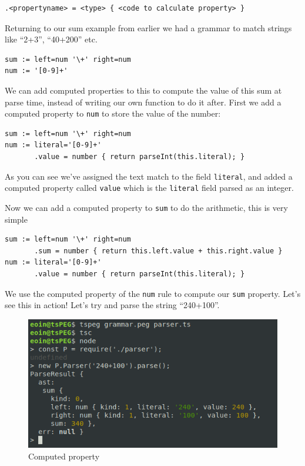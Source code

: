 \begin{verbatim}
.<propertyname> = <type> { <code to calculate property> }
\end{verbatim}

Returning to our sum example from earlier we had a grammar to match
strings like ``2+3'', ``40+200'' etc.

\begin{verbatim}
sum := left=num '\+' right=num
num := '[0-9]+'
\end{verbatim}

We can add computed properties to this to compute the value of this sum
at parse time, instead of writing our own function to do it after. First
we add a computed property to \texttt{num} to store the value of the
number:

\begin{verbatim}
sum := left=num '\+' right=num
num := literal='[0-9]+'
       .value = number { return parseInt(this.literal); }
\end{verbatim}

As you can see we've assigned the text match to the field
\texttt{literal}, and added a computed property called \texttt{value}
which is the \texttt{literal} field parsed as an integer.

Now we can add a computed property to \texttt{sum} to do the arithmetic,
this is very simple

\begin{verbatim}
sum := left=num '\+' right=num
       .sum = number { return this.left.value + this.right.value }
num := literal='[0-9]+'
       .value = number { return parseInt(this.literal); }
\end{verbatim}

We use the computed property of the \texttt{num} rule to compute our
\texttt{sum} property. Let's see this in action! Let's try and parse the
string ``240+100''.

\begin{figure}[ht]
\centering
    \includegraphics[scale=0.7]{src/app1assets/computed.png}
\caption{Computed property}
\end{figure}

